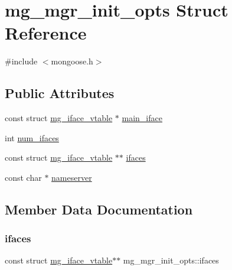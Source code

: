 \hypertarget{structmg__mgr__init__opts}{}\section{mg\+\_\+mgr\+\_\+init\+\_\+opts Struct Reference}
\label{structmg__mgr__init__opts}


{\ttfamily \#include $<$mongoose.\+h$>$}

\subsection*{Public Attributes}
\begin{DoxyCompactItemize}
\item 
const struct \hyperlink{structmg__iface__vtable}{mg\+\_\+iface\+\_\+vtable} $\ast$ \hyperlink{structmg__mgr__init__opts_ac72a1f670b50b1ab79bc9e2790f114c3_ac72a1f670b50b1ab79bc9e2790f114c3}{main\+\_\+iface}
\item 
int \hyperlink{structmg__mgr__init__opts_a9e6fe35e823019f31446d34e29cc3f4a_a9e6fe35e823019f31446d34e29cc3f4a}{num\+\_\+ifaces}
\item 
const struct \hyperlink{structmg__iface__vtable}{mg\+\_\+iface\+\_\+vtable} $\ast$$\ast$ \hyperlink{structmg__mgr__init__opts_adf5a32b0abe41300d2109969b768f33d_adf5a32b0abe41300d2109969b768f33d}{ifaces}
\item 
const char $\ast$ \hyperlink{structmg__mgr__init__opts_a1c54576a6dc65d0d1fba5caec53847fd_a1c54576a6dc65d0d1fba5caec53847fd}{nameserver}
\end{DoxyCompactItemize}


\subsection{Member Data Documentation}
\mbox{\label{structmg__mgr__init__opts_adf5a32b0abe41300d2109969b768f33d_adf5a32b0abe41300d2109969b768f33d}} 
\subsubsection{\texorpdfstring{ifaces}{ifaces}}
{\footnotesize\ttfamily const struct \hyperlink{structmg__iface__vtable}{mg\+\_\+iface\+\_\+vtable}$\ast$$\ast$ mg\+\_\+mgr\+\_\+init\+\_\+opts\+::ifaces}



